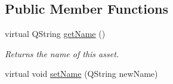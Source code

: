 \subsection*{Public Member Functions}
\begin{DoxyCompactItemize}
\item 
\hypertarget{class_picto_1_1_u_i_enabled_a98007f02abd55321577ef5db5460caba}{virtual Q\-String \hyperlink{class_picto_1_1_u_i_enabled_a98007f02abd55321577ef5db5460caba}{get\-Name} ()}\label{class_picto_1_1_u_i_enabled_a98007f02abd55321577ef5db5460caba}

\begin{DoxyCompactList}\small\item\em Returns the name of this asset. \end{DoxyCompactList}\item 
\hypertarget{class_picto_1_1_u_i_enabled_a0fd1659233b0cf46ede8cbaa2c8034df}{virtual void \hyperlink{class_picto_1_1_u_i_enabled_a0fd1659233b0cf46ede8cbaa2c8034df}{set\-Name} (Q\-String new\-Name)}\label{class_picto_1_1_u_i_enabled_a0fd1659233b0cf46ede8cbaa2c8034df}


\end{DoxyCompactItemize}
